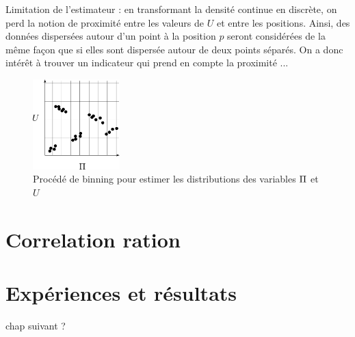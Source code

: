 Limitation de l'estimateur : en transformant la densité continue en discrète, on perd la notion de proximité entre les valeurs de $U$ et entre les positions. Ainsi, des données dispersées autour d'un point à la position $p$ seront considérées de la même façon que si elles sont dispersée autour de deux points séparés. On a donc intérêt à trouver un indicateur qui prend en compte la proximité ...

\begin{figure}
\centering
\includegraphics[width=0.3\textwidth]{boxes}
\caption{Procédé de binning pour estimer les distributions des variables $\Pi$ et $U$}
\label{fig:binning} 
\end{figure}

\section{Correlation ration}


\section{Expériences et résultats}

chap suivant ? 
